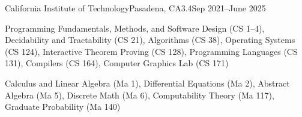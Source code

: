 \documentclass[a4paper,10pt]{article}
\begin{document}


    \begin{school}{California Institute of Technology}{Pasadena, CA}{3.4}{Sep 2021--June 2025}

        \item Programming Fundamentals, Methods, and Software Design (CS 1--4), Decidability and Tractability (CS 21), Algorithms (CS 38), Operating Systems (CS 124), Interactive Theorem Proving (CS 128), Programming Languages (CS 131), Compilers (CS 164), Computer Graphics Lab (CS 171)


        \item Calculus and Linear Algebra (Ma 1), Differential Equations (Ma 2), Abstract Algebra (Ma 5), Discrete Math (Ma 6), Computability Theory (Ma 117), Graduate Probability (Ma 140)
    \end{school}
\end{document}
